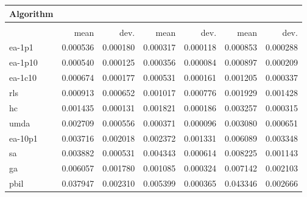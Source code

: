 \begin{tabular}{@{} l *{6}{>{{}}N{1}{2}} @{}}
\toprule
{Algorithm} &  \\
\midrule
&  &  &  \\
\midrule
& {mean} & {dev.} & {mean} & {dev.} & {mean} & {dev.} \\
\midrule
ea-1p1 & 0.000536 & 0.000180 & 0.000317 & 0.000118 & 0.000853 & 0.000288 \\
ea-1p10 & 0.000540 & 0.000125 & 0.000356 & 0.000084 & 0.000897 & 0.000209 \\
ea-1c10 & 0.000674 & 0.000177 & 0.000531 & 0.000161 & 0.001205 & 0.000337 \\
rls & 0.000913 & 0.000652 & 0.001017 & 0.000776 & 0.001929 & 0.001428 \\
hc & 0.001435 & 0.000131 & 0.001821 & 0.000186 & 0.003257 & 0.000315 \\
umda & 0.002709 & 0.000556 & 0.000371 & 0.000096 & 0.003080 & 0.000651 \\
ea-10p1 & 0.003716 & 0.002018 & 0.002372 & 0.001331 & 0.006089 & 0.003348 \\
sa & 0.003882 & 0.000531 & 0.004343 & 0.000614 & 0.008225 & 0.001143 \\
ga & 0.006057 & 0.001780 & 0.001085 & 0.000324 & 0.007142 & 0.002103 \\
pbil & 0.037947 & 0.002310 & 0.005399 & 0.000365 & 0.043346 & 0.002666 \\
\bottomrule
\end{tabular}
